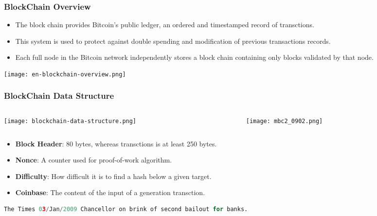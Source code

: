 \begin{frame}
    \frametitle{BlockChain Overview}
    \begin{itemize}
        \item The block chain provides Bitcoin's public ledger, an ordered and timestamped record of transctions.
        \item This system is used to protect against double spending and modification of previous transactions records.
        \item Each full node in the Bitcoin network independently stores a block chain containing only blocks validated by that node.
    \end{itemize}
    \texttt{[image: en-blockchain-overview.png]}
\end{frame}

\begin{frame}[fragile]
    \frametitle{BlockChain Data Structure}
    \begin{columns}
        \begin{column}{0.6\textwidth}
            \texttt{[image: blockchain-data-structure.png]}
        \end{column}
        \begin{column}{0.4\textwidth}
            \texttt{[image: mbc2\_0902.png]}
        \end{column}
    \end{columns}
    \begin{itemize}
        \item \textbf{Block Header}: 80 bytes, whereas transctions is at least 250 bytes.
        \item \textbf{Nonce}: A counter used for proof-of-work algorithm.
        \item \textbf{Difficulty}: How difficult it is to find a hash below a given target.
        \item \textbf{Coinbase}: The content of the \alert{input} of a generation transction.
    \end{itemize}
    \begin{lstlisting}[language=Python]
The Times 03/Jan/2009 Chancellor on brink of second bailout for banks. \end{lstlisting}
\end{frame}

